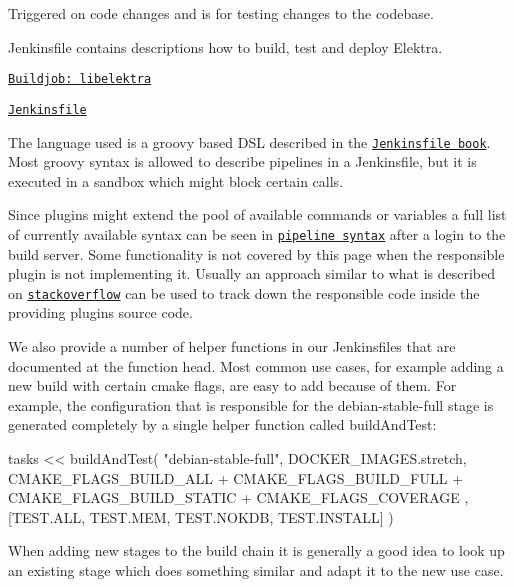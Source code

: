 \begin{DoxyItemize}
\item Triggered on code changes and is for testing changes to the codebase.
\item Jenkinsfile contains descriptions how to build, test and deploy Elektra.
\item \href{https://build.libelektra.org/job/libelektra/}{\tt Buildjob\+: libelektra}
\item \href{https://master.libelektra.org/scripts/jenkins/Jenkinsfile}{\tt Jenkinsfile}
\end{DoxyItemize}

The language used is a groovy based D\+SL described in the \href{https://jenkins.io/doc/book/pipeline/jenkinsfile/}{\tt Jenkinsfile book}. Most groovy syntax is allowed to describe pipelines in a Jenkinsfile, but it is executed in a sandbox which might block certain calls.

Since plugins might extend the pool of available commands or variables a full list of currently available syntax can be seen in \href{https://build.libelektra.org/job/libelektra/pipeline-syntax/}{\tt pipeline syntax} after a login to the build server. Some functionality is not covered by this page when the responsible plugin is not implementing it. Usually an approach similar to what is described on \href{https://stackoverflow.com/questions/51103359/jenkins-pipeline-return-value-of-build-step}{\tt stackoverflow} can be used to track down the responsible code inside the providing plugins source code.

We also provide a number of helper functions in our Jenkinsfiles that are documented at the function head. Most common use cases, for example adding a new build with certain cmake flags, are easy to add because of them. For example, the configuration that is responsible for the {\ttfamily debian-\/stable-\/full} stage is generated completely by a single helper function called {\ttfamily build\+And\+Test}\+:


\begin{DoxyCode}
tasks << buildAndTest(
  "debian-stable-full",
  DOCKER\_IMAGES.stretch,
  CMAKE\_FLAGS\_BUILD\_ALL +
    CMAKE\_FLAGS\_BUILD\_FULL +
    CMAKE\_FLAGS\_BUILD\_STATIC +
    CMAKE\_FLAGS\_COVERAGE
  ,
  [TEST.ALL, TEST.MEM, TEST.NOKDB, TEST.INSTALL]
)
\end{DoxyCode}


When adding new stages to the build chain it is generally a good idea to look up an existing stage which does something similar and adapt it to the new use case.

